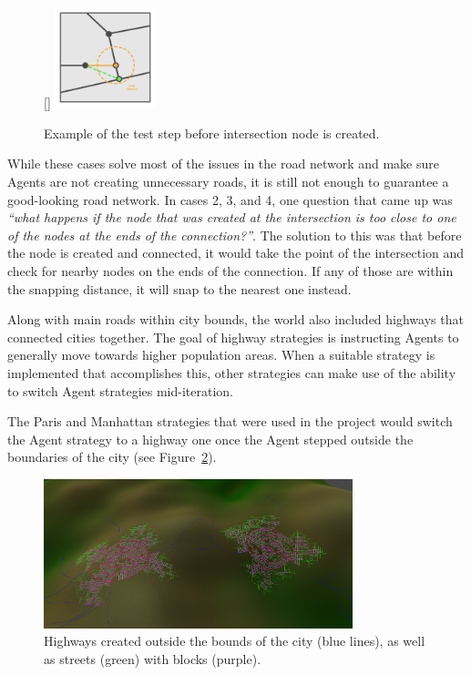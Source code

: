 \begin{figure}
  \centering
  \raisebox{0pt}[\dimexpr{}\baselineskip\relax]{
    \includegraphics[width=0.26\textwidth]{figure/road_intersection_final_test.png}
  }
  \caption{Example of the test step before intersection node is created.}

  \label{fig:road_intersection_final_test}
\end{figure}

While these cases solve most of the issues in the road network and make sure Agents are not creating unnecessary roads, it is still not enough to guarantee a good-looking road network.
In cases 2, 3, and 4, one question that came up was \textit{``what happens if the node that was created at the intersection is too close to one of the nodes at the ends of the connection?''}.
The solution to this was that before the node is created and connected, it would take the point of the intersection and check for nearby nodes on the ends of the connection.
If any of those are within the snapping distance, it will snap to the nearest one instead.


Along with main roads within city bounds, the world also included highways that connected cities together.
The goal of highway strategies is instructing Agents to generally move towards higher population areas.
When a suitable strategy is implemented that accomplishes this, other strategies can make use of the ability to switch Agent strategies mid-iteration.

The Paris and Manhattan strategies that were used in the project would switch the Agent strategy to a highway one once the Agent stepped outside the boundaries of the city (see Figure~\ref{fig:road_highways}).

\begin{figure}[H]
  \centering

  \includegraphics[width=0.8\textwidth]{figure/road_highways.png}
  \caption{Highways created outside the bounds of the city (blue lines), as well as streets (green) with blocks (purple).}

  \label{fig:road_highways}
\end{figure}

